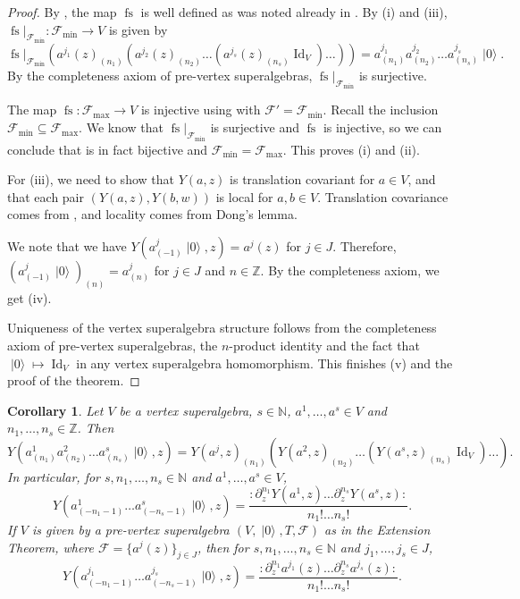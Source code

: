 \documentclass[a4paper, 12pt, reqno]{amsart}
\newtheorem{corollary}[theorem]{Corollary}
\theoremstyle{remark}
\numberwithin{equation}{subsection}
\DeclareMathOperator{\Id}{Id}
\DeclareMathOperator{\vac}{|0\rangle}
\DeclareMathOperator{\fs}{fs}
\begin{document}
\begin{proof}
  By , the map $\fs$ is well defined as was noted already in .
  By (i) and (iii), $\fs|_{\mathcal{F}_{\min}}: \mathcal{F}_{\min} \to V$ is given by
  \begin{equation*}
    \fs|_{\mathcal{F}_{\min}}(a^{j_1}(z)_{(n_1)}(a^{j_2}(z)_{(n_2)}\dots (a^{j_s}(z)_{(n_s)}\Id_V)\dots)) = a^{j_1}_{(n_1)}a^{j_2}_{(n_2)}\dots a^{j_s}_{(n_s)}\vac.
  \end{equation*}
  By the completeness axiom of pre-vertex superalgebras, $\fs|_{\mathcal{F}_{\min}}$ is surjective.

  The map $\fs: \mathcal{F}_{\max} \to V$ is injective using  with $\mathcal{F}' = \mathcal{F}_{\min}$.
  Recall the inclusion $\mathcal{F}_{\min} \subseteq \mathcal{F}_{\max}$.
  We know that $\fs|_{\mathcal{F}_{\min}}$ is surjective and $\fs$ is injective, so we can conclude that is in fact bijective and $\mathcal{F}_{\min} = \mathcal{F}_{\max}$.
  This proves (i) and (ii).

  For (iii), we need to show that $Y(a, z)$ is translation covariant for $a \in V$, and that each pair $(Y(a, z), Y(b, w))$ is local for $a, b \in V$.
  Translation covariance comes from , and locality comes from Dong's lemma.

  We note that we have $Y(a^j_{(-1)}\vac, z) = a^j(z)$ for $j \in J$.
  Therefore, $(a^j_{(-1)}\vac)_{(n)} = a^j_{(n)}$ for $j \in J$ and $n \in \mathbb{Z}$.
  By the completeness axiom, we get (iv).

  Uniqueness of the vertex superalgebra structure follows from the completeness axiom of pre-vertex superalgebras, the $n$-product identity and the fact that $\vac \mapsto \Id_V$ in any vertex superalgebra homomorphism.
  This finishes (v) and the proof of the theorem.
\end{proof}

\begin{corollary}
  \label{crl:1}
  Let $V$ be a vertex superalgebra, $s \in \mathbb{N}$, $a^1, \dots, a^s \in V$ and $n_1, \dots, n_s \in \mathbb{Z}$.
  Then
  \begin{equation*}
    Y(a^1_{(n_1)}a^2_{(n_2)}\dots a^s_{(n_s)}\vac, z) = Y(a^j, z)_{(n_1)}(Y(a^2, z)_{(n_2)}\dots (Y(a^s, z)_{(n_s)}\Id_V)\dots).
  \end{equation*}
  In particular, for $s, n_1, \dots, n_s \in \mathbb{N}$ and $a^1, \dots, a^s \in V$,
  \begin{equation*}
    Y(a^1_{(-n_1 - 1)}\dots a^s_{(-n_s - 1)}\vac, z) = \frac{:\partial^{n_1}_zY(a^1, z)\dots \partial^{n_s}_zY(a^s, z):}{n_1!\dots n_s!}.
  \end{equation*}
  If $V$ is given by a pre-vertex superalgebra $(V, \vac, T, \mathcal{F})$ as in the Extension Theorem, where $\mathcal{F} = \{a^j(z)\}_{j \in J}$, then for $s, n_1, \dots, n_s \in \mathbb{N}$ and $j_1, \dots, j_s \in J$,
  \begin{equation*}
    Y(a^{j_1}_{(-n_1 - 1)}\dots a^{j_s}_{(-n_s - 1)}\vac, z) = \frac{:\partial^{n_1}_za^{j_1}(z)\dots \partial^{n_s}_za^{j_s}(z):}{n_1!\dots n_s!}.
  \end{equation*}
\end{corollary}
\end{document}
